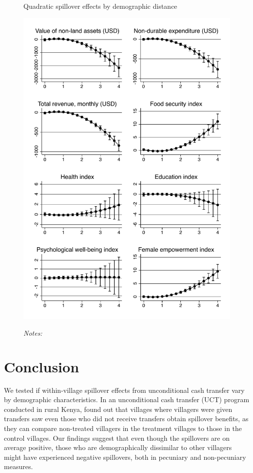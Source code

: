 \documentclass[11pt]{article}
\begin{document}
    \begin{figure}[ht]
    \centering
    \caption{Quadratic spillover effects by demographic distance}
    \includegraphics[height=0.85\textheight]{../Figs/indices_ppp_margins.pdf}
    \label{fig:margins}
    \caption*{\footnotesize \emph{Notes:} }
    \end{figure}

\section{Conclusion}

    We tested if within-village spillover effects from unconditional cash transfer vary by demographic characteristics. In an unconditional cash transfer (UCT) program conducted in rural Kenya, \textcite{haushofer_short-term_2016} found out that villages where villagers were given transfers saw even those who did not receive transfers obtain spillover benefits, as they can compare non-treated villagers in the treatment villages to those in the control villages. Our findings suggest that even though the spillovers are on average positive, those who are demographically dissimilar to other villagers might have experienced negative spillovers, both in pecuniary and non-pecuniary measures.


\newpage

\printbibliography
\end{document}
